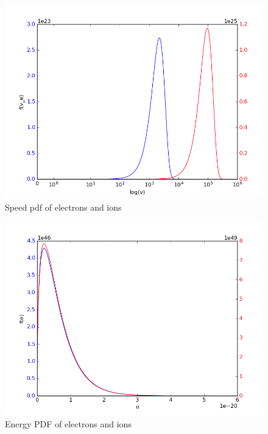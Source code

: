\documentclass[11pt, a4paper]{article}
\begin{document}
\begin{figure}[H]
 \centering
 \includegraphics[scale = 0.5]{Plasma_speed.png}
 \caption{Speed pdf of electrons and ions}
 \label{fig:plasma_s}
\end{figure}


\begin{figure}[H]
 \centering
 \includegraphics[scale = 0.5]{Plasma_energy.png}
 \caption{Energy PDF of electrons and ions}
 \label{fig:plasma_e}
\end{figure}
\end{document}
